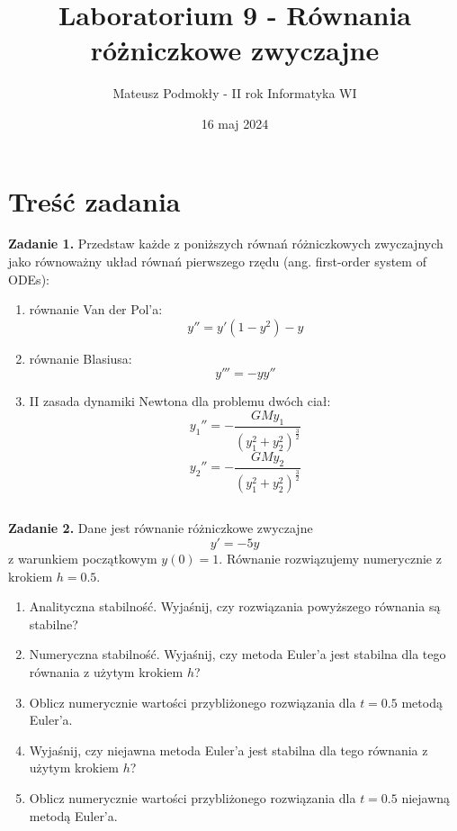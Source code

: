 \documentclass[11pt, leqno]{scrartcl}
\title{Laboratorium 9 - Równania różniczkowe zwyczajne}
\author{Mateusz Podmokły - II rok Informatyka WI}
\date{16 maj 2024}
\begin{document}
    \maketitle
    \section{Treść zadania}
    \textbf{Zadanie 1.} Przedstaw każde z poniższych równań
    różniczkowych zwyczajnych jako równoważny układ równań
    pierwszego rzędu (ang. ﬁrst-order system of ODEs):
    \begin{enumerate}
        \item równanie Van der Pol'a:
            \[
                y''=y'(1-y^2)-y
            \]
        \item równanie Blasiusa:
            \[
                y'''=-yy''
            \]
        \item II zasada dynamiki Newtona dla problemu dwóch
            ciał:
            \[
                y_1''=-\frac{GMy_1}{(y_1^2+y_2^2)^{\frac{3}{2}}}
            \]
            \[
                y_2''=-\frac{GMy_2}{(y_1^2+y_2^2)^{\frac{3}{2}}}
            \]
    \end{enumerate}

    \subsection*{}
    \textbf{Zadanie 2.} Dane jest równanie różniczkowe
    zwyczajne
    \[
        y'=-5y
    \]
    z warunkiem początkowym $y(0) = 1$. Równanie rozwiązujemy
    numerycznie z krokiem $h = 0.5$.
    \begin{enumerate}
        \item Analityczna stabilność. Wyjaśnij, czy rozwiązania
            powyższego równania są stabilne?
        \item Numeryczna stabilność. Wyjaśnij, czy metoda
            Euler'a jest stabilna dla tego równania z użytym
            krokiem $h$?
        \item Oblicz numerycznie wartości przybliżonego
            rozwiązania dla $t = 0.5$ metodą Euler'a.
        \item Wyjaśnij, czy niejawna metoda Euler'a jest
            stabilna dla tego równania z użytym krokiem $h$?
        \item Oblicz numerycznie wartości przybliżonego
            rozwiązania dla $t = 0.5$ niejawną metodą Euler'a.
    \end{enumerate}
\end{document}
